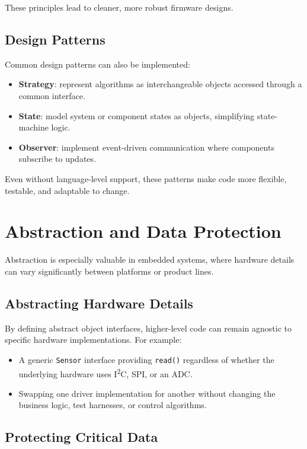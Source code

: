 \documentclass[11pt]{article}
\begin{document}
These principles lead to cleaner, more robust firmware designs.

\subsection{Design Patterns}

Common design patterns can also be implemented:
\begin{itemize}[nosep]
  \item \textbf{Strategy}: represent algorithms as interchangeable objects accessed through a common interface.
  \item \textbf{State}: model system or component states as objects, simplifying state-machine logic.
  \item \textbf{Observer}: implement event-driven communication where components subscribe to updates.
\end{itemize}

Even without language-level support, these patterns make code more flexible, testable, and adaptable to change.

\section{Abstraction and Data Protection}

Abstraction is especially valuable in embedded systems, where hardware details can vary significantly between platforms or product lines.

\subsection{Abstracting Hardware Details}

By defining abstract object interfaces, higher-level code can remain agnostic to specific hardware implementations. For example:
\begin{itemize}[nosep]
  \item A generic \texttt{Sensor} interface providing \texttt{read()} regardless of whether the underlying hardware uses I\textsuperscript{2}C, SPI, or an ADC.
  \item Swapping one driver implementation for another without changing the business logic, test harnesses, or control algorithms.
\end{itemize}

\subsection{Protecting Critical Data}
\end{document}
